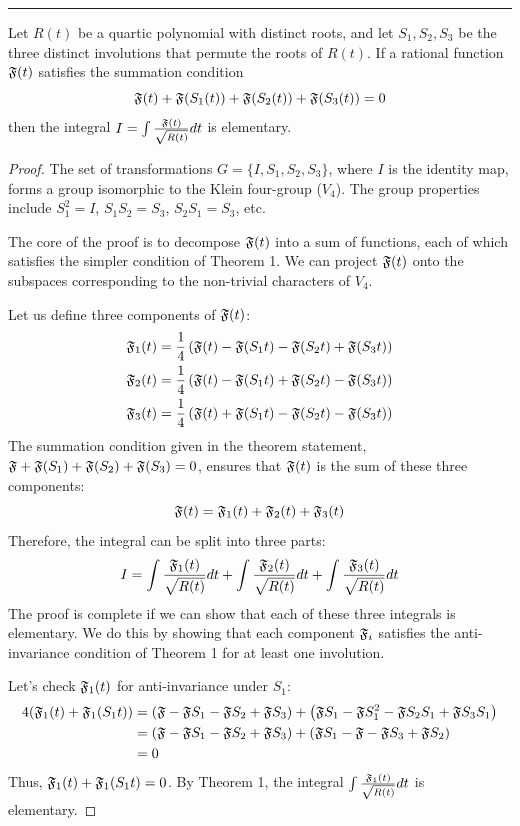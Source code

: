 \documentclass[11pt]{article}
\begin{document}
\bigskip

\hrule

\medskip

{
\color{blue}

\begin{theorem*}
Let $R(t)$ be a quartic polynomial with distinct roots, and let $S_1, S_2, S_3$ be the three distinct involutions that permute the roots of $R(t)$. If a rational function $\mathfrak{F}(t)$ satisfies the summation condition
$$ \mathfrak{F}(t) + \mathfrak{F}(S_1(t)) + \mathfrak{F}(S_2(t)) + \mathfrak{F}(S_3(t)) = 0 $$
then the integral $I = \int \frac{\mathfrak{F}(t)}{\sqrt{R(t)}} dt$ is elementary.
\end{theorem*}

\begin{proof}
The set of transformations $G = \{I, S_1, S_2, S_3\}$, where $I$ is the identity map, forms a group isomorphic to the Klein four-group ($V_4$). The group properties include $S_1^2=I$, $S_1 S_2 = S_3$, $S_2 S_1 = S_3$, etc.

The core of the proof is to decompose $\mathfrak{F}(t)$ into a sum of functions, each of which satisfies the simpler condition of Theorem 1. We can project $\mathfrak{F}(t)$ onto the subspaces corresponding to the non-trivial characters of $V_4$.

Let us define three components of $\mathfrak{F}(t)$:
\begin{align*}
\mathfrak{F}_1(t) &= \frac{1}{4} \left( \mathfrak{F}(t) - \mathfrak{F}(S_1 t) - \mathfrak{F}(S_2 t) + \mathfrak{F}(S_3 t) \right) \\
\mathfrak{F}_2(t) &= \frac{1}{4} \left( \mathfrak{F}(t) - \mathfrak{F}(S_1 t) + \mathfrak{F}(S_2 t) - \mathfrak{F}(S_3 t) \right) \\
\mathfrak{F}_3(t) &= \frac{1}{4} \left( \mathfrak{F}(t) + \mathfrak{F}(S_1 t) - \mathfrak{F}(S_2 t) - \mathfrak{F}(S_3 t) \right)
\end{align*}
The summation condition given in the theorem statement, $\mathfrak{F} + \mathfrak{F}(S_1) + \mathfrak{F}(S_2) + \mathfrak{F}(S_3) = 0$, ensures that $\mathfrak{F}(t)$ is the sum of these three components:
$$ \mathfrak{F}(t) = \mathfrak{F}_1(t) + \mathfrak{F}_2(t) + \mathfrak{F}_3(t) $$
Therefore, the integral can be split into three parts:
$$ I = \int \frac{\mathfrak{F}_1(t)}{\sqrt{R(t)}} dt + \int \frac{\mathfrak{F}_2(t)}{\sqrt{R(t)}} dt + \int \frac{\mathfrak{F}_3(t)}{\sqrt{R(t)}} dt $$
The proof is complete if we can show that each of these three integrals is elementary. We do this by showing that each component $\mathfrak{F}_i$ satisfies the anti-invariance condition of Theorem 1 for at least one involution.

Let's check $\mathfrak{F}_1(t)$ for anti-invariance under $S_1$:
\begin{align*}
4(\mathfrak{F}_1(t) + \mathfrak{F}_1(S_1 t)) &= \left( \mathfrak{F} - \mathfrak{F} S_1 - \mathfrak{F} S_2 + \mathfrak{F} S_3 \right) + \left( \mathfrak{F} S_1 - \mathfrak{F} S_1^2 - \mathfrak{F} S_2 S_1 + \mathfrak{F} S_3 S_1 \right) \\
&= \left( \mathfrak{F} - \mathfrak{F} S_1 - \mathfrak{F} S_2 + \mathfrak{F} S_3 \right) + \left( \mathfrak{F} S_1 - \mathfrak{F} - \mathfrak{F} S_3 + \mathfrak{F} S_2 \right) \\
&= 0
\end{align*}
Thus, $\mathfrak{F}_1(t) + \mathfrak{F}_1(S_1 t) = 0$. By Theorem 1, the integral $\int \frac{\mathfrak{F}_1(t)}{\sqrt{R(t)}} dt$ is elementary.


\end{proof}}
\end{document}
